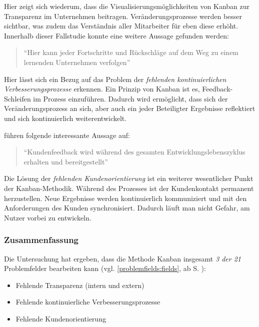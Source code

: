Hier zeigt sich wiederum, dass die Visualisierungsmöglichkeiten von Kanban zur Transparenz im Unternehmen beitragen. Veränderungsprozesse werden besser sichtbar, was zudem das Verständnis aller Mitarbeiter für eben diese erhöht. Innerhalb dieser Fallstudie konnte eine weitere Aussage gefunden werden:

\begin{quote}
	``Hier kann jeder Fortschritte und Rückschläge auf dem Weg zu einem lernenden Unternehmen verfolgen'' \cite[S. 212]{fuchs_adapting_2019}
\end{quote}

Hier lässt sich ein Bezug auf das Problem der \textit{fehlenden kontinuierlichen Verbesserungsprozesse} erkennen. Ein Prinzip von Kanban ist es, Feedback-Schleifen im Prozess einzuführen. Dadurch wird ermöglicht, dass sich der Veränderungsprozess an sich, aber auch ein jeder Beteiligter Ergebnisse reflektiert und sich kontinuierlich weiterentwickelt. 

 führen folgende interessante Aussage auf:

\begin{quote}
	``Kundenfeedback wird während des gesamten Entwicklungslebenszyklus erhalten und bereitgestellt'' \cite[S. 7]{rodriguez_combining_2014}
\end{quote}

Die Lösung der \textit{fehlenden Kundenorientierung} ist ein weiterer wesentlicher Punkt der Kanban-Methodik. Während des Prozesses ist der Kundenkontakt permanent herzustellen. Neue Ergebnisse werden kontinuierlich kommuniziert und mit den Anforderungen des Kunden synchronisiert. Dadurch läuft man nicht Gefahr, am Nutzer vorbei zu entwickeln.


\subsubsection{Zusammenfassung}

Die Untersuchung hat ergeben, dass die Methode Kanban insgesamt \textit{3 der 21} Problemfelder bearbeiten kann (vgl. \ref{problemfields:fields}, ab S. \pageref{problemfields:fields}):

\begin{itemize}[noitemsep, topsep=0pt]
	\item Fehlende Transparenz (intern und extern)
	\item Fehlende kontinuierliche Verbesserungsprozesse
	\item Fehlende Kundenorientierung
\end{itemize}

